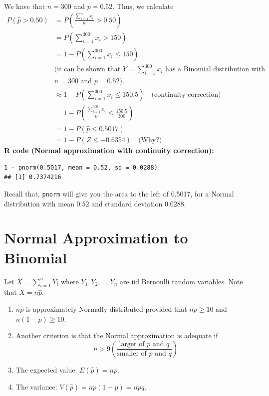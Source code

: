 \begin{example}
We have that $n = 300$ and $p = 0.52$.
Thus, we calculate
\begin{align*}
P(\hat{p} > 0.50) &= P\left( \frac{\sum_{i=1}^{n} x_i}{n} > 0.50 \right) \\
&= P\left( \sum_{i=1}^{300} x_i > 150 \right) \\
&= 1 - P\left( \sum_{i=1}^{300} x_i \leq 150 \right) \\
&\text{(it can be shown that } Y = \sum_{i=1}^{300} x_i \text{ has a Binomial distribution with} \\
&n = 300 \text{ and } p = 0.52\text{)}. \\
&\approx 1 - P\left( \sum_{i=1}^{300} x_i \leq 150.5 \right) \quad \text{(continuity correction)} \\
&= 1 - P\left( \frac{\sum_{i=1}^{300} x_i}{n} \leq \frac{150.5}{300} \right) \\
&= 1 - P(\hat{p} \leq 0.5017) \\
&= 1 - P\left( Z \leq -0.6354 \right) \quad \text{(Why?)}
\end{align*}
\noindent\textbf{R code (Normal approximation with continuity correction):}
\begin{tcolorbox}[colback=gray!10, colframe=black!45, arc=2mm]
\begin{verbatim}
1 - pnorm(0.5017, mean = 0.52, sd = 0.0288)
## [1] 0.7374216
\end{verbatim}
\end{tcolorbox}

Recall that, \texttt{pnorm} will give you the area to the left of 0.5017, for a Normal distribution with mean 0.52 and standard deviation 0.0288.
\end{example}

\section{Normal Approximation to Binomial}

Let $X = \sum_{i=1}^{n} Y_i$ where $Y_1, Y_2, \ldots, Y_n$ are iid Bernoulli random variables. Note that $X = n\hat{p}$.

\begin{enumerate}
    \item $n\hat{p}$ is approximately Normally distributed provided that $np \geq 10$ and $n(1 - p) \geq 10$.

    \item Another criterion is that the Normal approximation is adequate if
    \[
    n > 9 \left( \frac{\text{larger of $p$ and $q$}}{\text{smaller of $p$ and $q$}} \right)
    \]

    \item The expected value: $E(\hat{p}) = np$.

    \item The variance: $V(\hat{p}) = np(1 - p) = npq$.
\end{enumerate}


